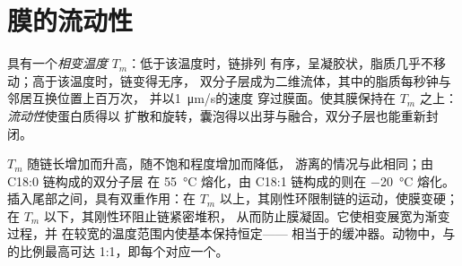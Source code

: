 \section{膜的流动性}

\begin{definition}[流动性，相变]\label{def:b1:lipids:fluidity}
具有一个\emph{相变温度} $T_m$：低于该温度时，链排列
有序，呈凝胶状，脂质几乎不移动；高于该温度时，链变得无序，
双分子层成为二维流体，其中的脂质每秒钟与邻居互换位置上百万次，
并以\qty{1}{\micro m/s}的速度
穿过膜面。使其膜保持在
$T_m$ 之上：\emph{流动性}使蛋白质得以
扩散和旋转，囊泡得以出芽与融合，双分子层也能重新封闭。
\end{definition}

\begin{proposition}[决定流动性的因素]\label{prop:b1:lipids:fluidityfactors}
$T_m$ 随链长增加而升高，随不饱和程度增加而降低，
游离的情况与此相同；由 C18:0 链构成的双分子层
在 \qty{55}{\celsius} 熔化，由 C18:1 链构成的则在 \qty{-20}{\celsius} 熔化。
插入尾部之间，具有双重作用：在
$T_m$ 以上，其刚性环限制链的运动，使膜变硬；
在 $T_m$ 以下，其刚性环阻止链紧密堆积，
从而防止膜凝固。它使相变展宽为渐变过程，并
在较宽的温度范围内使基本保持恒定——
相当于的缓冲器。动物中，与的比例最高可达
1:1，即每个对应一个。
\end{proposition}

